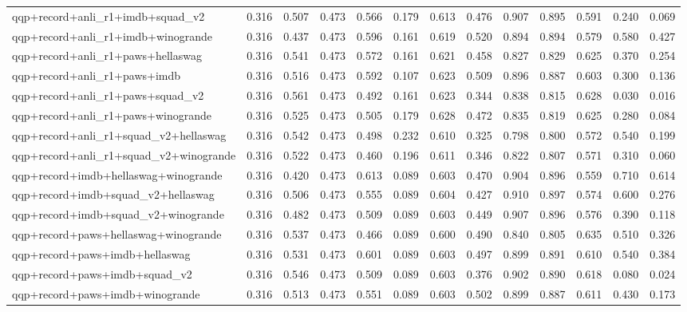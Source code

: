 \begin{table}[t]
\begin{tabular}{lrrrrrrrrrrrr}
    qqp+record+anli\_r1+imdb+squad\_v2 & 0.316 & 0.507 & 0.473 & 0.566 & 0.179 & 0.613 & 0.476 & 0.907 & 0.895 & 0.591 & 0.240 & 0.069 \\
    qqp+record+anli\_r1+imdb+winogrande & 0.316 & 0.437 & 0.473 & 0.596 & 0.161 & 0.619 & 0.520 & 0.894 & 0.894 & 0.579 & 0.580 & 0.427 \\
    qqp+record+anli\_r1+paws+hellaswag & 0.316 & 0.541 & 0.473 & 0.572 & 0.161 & 0.621 & 0.458 & 0.827 & 0.829 & 0.625 & 0.370 & 0.254 \\
    qqp+record+anli\_r1+paws+imdb & 0.316 & 0.516 & 0.473 & 0.592 & 0.107 & 0.623 & 0.509 & 0.896 & 0.887 & 0.603 & 0.300 & 0.136 \\
    qqp+record+anli\_r1+paws+squad\_v2 & 0.316 & 0.561 & 0.473 & 0.492 & 0.161 & 0.623 & 0.344 & 0.838 & 0.815 & 0.628 & 0.030 & 0.016 \\
    qqp+record+anli\_r1+paws+winogrande & 0.316 & 0.525 & 0.473 & 0.505 & 0.179 & 0.628 & 0.472 & 0.835 & 0.819 & 0.625 & 0.280 & 0.084 \\
    qqp+record+anli\_r1+squad\_v2+hellaswag & 0.316 & 0.542 & 0.473 & 0.498 & 0.232 & 0.610 & 0.325 & 0.798 & 0.800 & 0.572 & 0.540 & 0.199 \\
    qqp+record+anli\_r1+squad\_v2+winogrande & 0.316 & 0.522 & 0.473 & 0.460 & 0.196 & 0.611 & 0.346 & 0.822 & 0.807 & 0.571 & 0.310 & 0.060 \\
    qqp+record+imdb+hellaswag+winogrande & 0.316 & 0.420 & 0.473 & 0.613 & 0.089 & 0.603 & 0.470 & 0.904 & 0.896 & 0.559 & 0.710 & 0.614 \\
    qqp+record+imdb+squad\_v2+hellaswag & 0.316 & 0.506 & 0.473 & 0.555 & 0.089 & 0.604 & 0.427 & 0.910 & 0.897 & 0.574 & 0.600 & 0.276 \\
    qqp+record+imdb+squad\_v2+winogrande & 0.316 & 0.482 & 0.473 & 0.509 & 0.089 & 0.603 & 0.449 & 0.907 & 0.896 & 0.576 & 0.390 & 0.118 \\
    qqp+record+paws+hellaswag+winogrande & 0.316 & 0.537 & 0.473 & 0.466 & 0.089 & 0.600 & 0.490 & 0.840 & 0.805 & 0.635 & 0.510 & 0.326 \\
    qqp+record+paws+imdb+hellaswag & 0.316 & 0.531 & 0.473 & 0.601 & 0.089 & 0.603 & 0.497 & 0.899 & 0.891 & 0.610 & 0.540 & 0.384 \\
    qqp+record+paws+imdb+squad\_v2 & 0.316 & 0.546 & 0.473 & 0.509 & 0.089 & 0.603 & 0.376 & 0.902 & 0.890 & 0.618 & 0.080 & 0.024 \\
    qqp+record+paws+imdb+winogrande & 0.316 & 0.513 & 0.473 & 0.551 & 0.089 & 0.603 & 0.502 & 0.899 & 0.887 & 0.611 & 0.430 & 0.173 \\

\end{tabular}
\end{table}
